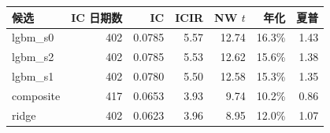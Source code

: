 \begin{tabular}{@{}lrrrrrr@{}}
\toprule
候选 & IC 日期数 & IC & ICIR & NW $t$ & 年化 & 夏普 \\
\midrule
lgbm\_s0 & 402 & 0.0785 & 5.57 & 12.74 & 16.3\% & 1.43 \\
lgbm\_s2 & 402 & 0.0785 & 5.53 & 12.62 & 15.6\% & 1.38 \\
lgbm\_s1 & 402 & 0.0780 & 5.50 & 12.58 & 15.3\% & 1.35 \\
composite & 417 & 0.0653 & 3.93 & 9.74 & 10.2\% & 0.86 \\
ridge & 402 & 0.0623 & 3.96 & 8.95 & 12.0\% & 1.07 \\
\bottomrule
\end{tabular}
